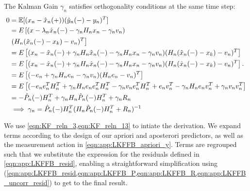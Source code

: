 The Kalman Gain $\gamma_n$ satisfies orthogonality conditions at the same time step:
\begin{align}
0 &= \mathbb{E}[(x_n - \hat{x}_{n}(+))(\hat{y}_n(-) - y_n)^T] \\ 
& = E \left[ (x -\lambda_n \hat{x}_{n}(-) - \gamma_n H_n x_n - \gamma_n v_n) \right. \\
& \left. (H_n (\hat{x}_{n}(-) - x_{k}) -v_n)^T\right]  \label{eqn:app:LKFFB_apriori_y}\\
&= E\left[(x_n - \hat{x}_{n}(-) + \gamma_n H_n\hat{x}_{n}(-) - \gamma_n H_n x_n - \gamma_n v_n)(H_n (\hat{x}_{n}(-) - x_{k}) -v_n)^T\right]  \\
&= E\left[(x_n - \hat{x}_{n}(-) + \gamma_n H_n\hat{x}_{n}(-) - \gamma_n H_n x_n - \gamma_n v_n)(H_n (\hat{x}_{n}(-) - x_{k}) -v_n)^T\right].  \\
&= E\left[(-e_n + \gamma_n H_ne_n - \gamma_n v_n)(H_n e_n -v_n)^T\right]  \\
&= E\left[(-e_ne_n^T H_n^T+ \gamma_n H_ne_ne_n^T H_n^T - \gamma_n v_ne_n^T H_n^T + e_nv_n^T - \gamma_n H_ne_nv_n^T + \gamma_n v_nv_n^T \right]  \\
&= -\hat{P}_{n}(-) H_n^T+ \gamma_n H_n\hat{P}_{n}(-)H_n^T + \gamma_n R_n \\
& \implies \gamma_n = \hat{P}_{n}(-) H_n^T(H_n\hat{P}_{n}(-)H_n^T + R_n)^{-1} \label{eqn:KF_update_gamma}
\end{align} 

We use \cref{eqn:KF_reln_3,eqn:KF_reln_13} to intiate the derivation. We expand terms according to the design of our apriori and aposterori predictors, as well as the measurement action in \cref{eqn:app:LKFFB_apriori_y}. Terms are regrouped such that we substitute the expression for the residuals defined in \cref{eqn:app:LKFFB_resid}, enabling a straightforward simplification using (\cref{eqn:app:LKFFB_resid,eqn:app:LKFFB_P,eqn:app:LKFFB_R,eqn:app:LKFFB_uncorr_resid}) to get to the final result. 

